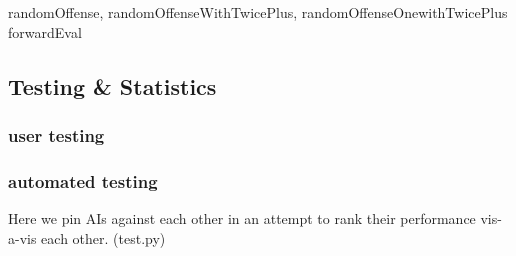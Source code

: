 \documentclass[11pt]{article}
\begin{document}
\begin{description}
\item[randomOffense, randomOffenseWithTwicePlus, randomOffenseOnewithTwicePlus]

\item[forwardEval]
\end{description}

\subsection{Testing \& Statistics}

\subsubsection{user testing}

\subsubsection{automated testing}
Here we pin AIs against each other in an attempt to rank their performance vis-a-vis each other. 
(test.py)
\end{document}
